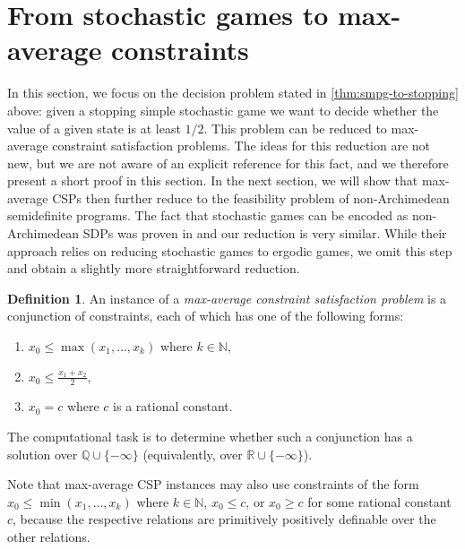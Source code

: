 \documentclass[11pt]{article}
\theoremstyle{definition}
\newtheorem{definition}[theorem]{Definition}
\theoremstyle{remark}
\newcommand{\R}{\mathbb{R}}
\newcommand{\Q}{\mathbb{Q}}
\newcommand{\N}{\mathbb{N}}
\begin{document}
\section{From stochastic games to 
max-average constraints}
\label{sect:max-avg}
In this section, we focus on the decision problem stated in \cref{thm:smpg-to-stopping} above: given a stopping simple stochastic game we want to decide whether the value of a given state is at least $1/2$. 
This problem can be reduced to max-average constraint satisfaction problems. 
The ideas for this reduction are not new, but we are not aware of an explicit reference for this fact, and we therefore present a short proof in this section. 
In the next section, we will show that max-average CSPs then further reduce to the 
feasibility problem of non-Archimedean semidefinite programs. 
The fact that stochastic games can be encoded as non-Archimedean SDPs was proven in \cite{issac2016jsc} and our reduction is very similar.  While their approach relies on reducing stochastic games to ergodic games, we omit this step and obtain a slightly more straightforward reduction. 

\begin{definition}\label{def:mma}
    An instance of a \emph{max-average constraint satisfaction problem} is a conjunction of constraints, each of which has one of the following forms: 
    \begin{enumerate}
        \item 
    $x_0 \leq \max(x_1,\dots,x_k)$ where $k \in \N$, 
        \item $x_0 \leq \frac{x_1+x_2}{2}$,
        \item $x_0 = c$ where $c$ is a rational constant. 
    \end{enumerate}
    The computational task is to determine whether such a conjunction has a solution over $\Q \cup \{-\infty\}$ (equivalently, over $\R \cup \{-\infty\} $).
\end{definition}

Note that max-average CSP instances may also use constraints of the form $x_0 \leq \min(x_1,\dots,x_k)$ where $k \in \N$, $x_0 \leq c$, or $x_0 \geq c$ for some rational constant $c$, because the respective relations are primitively positively definable over the other relations.
 
\end{document}
